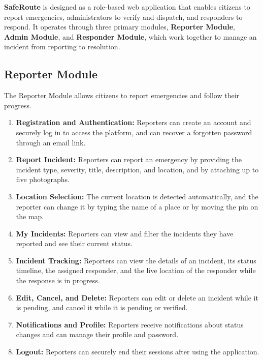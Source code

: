 \documentclass[a4paper,12pt]{report}
\begin{document}
	\noindent \textbf{SafeRoute} is designed as a role-based web application that enables citizens to report emergencies, administrators to verify and dispatch, and responders to respond. It operates through three primary modules, \textbf{Reporter Module}, \textbf{Admin Module}, and \textbf{Responder Module}, which work together to manage an incident from reporting to resolution.
	
	\subsection{Reporter Module}
	The Reporter Module allows citizens to report emergencies and follow their progress.
	
	\begin{enumerate}
		\item \textbf{Registration and Authentication:} Reporters can create an account and securely log in to access the platform, and can recover a forgotten password through an email link.
		
		\item \textbf{Report Incident:} Reporters can report an emergency by providing the incident type, severity, title, description, and location, and by attaching up to five photographs.
		
		\item \textbf{Location Selection:} The current location is detected automatically, and the reporter can change it by typing the name of a place or by moving the pin on the map.
		
		\item \textbf{My Incidents:} Reporters can view and filter the incidents they have reported and see their current status.
		
		\item \textbf{Incident Tracking:} Reporters can view the details of an incident, its status timeline, the assigned responder, and the live location of the responder while the response is in progress.
		
		\item \textbf{Edit, Cancel, and Delete:} Reporters can edit or delete an incident while it is pending, and cancel it while it is pending or verified.
		
		\item \textbf{Notifications and Profile:} Reporters receive notifications about status changes and can manage their profile and password.
		
		\item \textbf{Logout:} Reporters can securely end their sessions after using the application.
	\end{enumerate}
	
\end{document}
